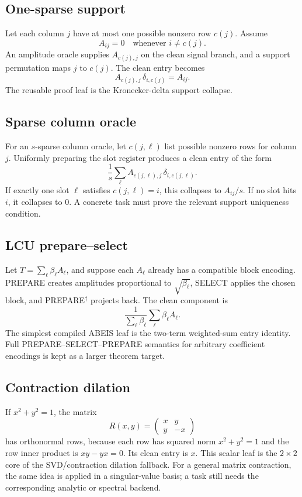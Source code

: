 \subsection{One-sparse support}

Let each column \(j\) have at most one possible nonzero row \(c(j)\).  Assume
\[
  A_{ij}=0\quad\text{whenever }i\neq c(j).
\]
An amplitude oracle supplies \(A_{c(j),j}\) on the clean signal branch, and a
support permutation maps \(j\) to \(c(j)\).  The clean entry becomes
\[
  A_{c(j),j}\,\delta_{i,c(j)} = A_{ij}.
\]
The reusable proof leaf is the Kronecker-delta support collapse.

\subsection{Sparse column oracle}

For an \(s\)-sparse column oracle, let \(c(j,\ell)\) list possible nonzero rows
for column \(j\).  Uniformly preparing the slot register produces a clean entry
of the form
\[
  \frac{1}{s}\sum_{\ell} A_{c(j,\ell),j}\,\delta_{i,c(j,\ell)}.
\]
If exactly one slot \(\ell\) satisfies \(c(j,\ell)=i\), this collapses to
\(A_{ij}/s\).  If no slot hits \(i\), it collapses to \(0\).  A concrete task
must prove the relevant support uniqueness condition.

\subsection{LCU prepare--select}

Let \(T=\sum_{\ell}\beta_\ell A_\ell\), and suppose each \(A_\ell\) already
has a compatible block encoding.  PREPARE creates amplitudes proportional to
\(\sqrt{\beta_\ell}\), SELECT applies the chosen block, and
PREPARE\({}^\dagger\) projects back.  The clean component is
\[
  \frac{1}{\sum_\ell \beta_\ell}
  \sum_\ell \beta_\ell A_\ell.
\]
The simplest compiled ABEIS leaf is the two-term weighted-sum entry identity.
Full PREPARE--SELECT--PREPARE semantics for arbitrary coefficient encodings is
kept as a larger theorem target.

\subsection{Contraction dilation}

If \(x^2+y^2=1\), the matrix
\[
  R(x,y)=
  \begin{pmatrix}
    x & y\\
    y & -x
  \end{pmatrix}
\]
has orthonormal rows, because each row has squared norm \(x^2+y^2=1\) and the
row inner product is \(xy-yx=0\).  Its clean entry is \(x\).  This scalar leaf
is the \(2\times2\) core of the SVD/contraction dilation fallback.  For a
general matrix contraction, the same idea is applied in a singular-value
basis; a task still needs the corresponding analytic or spectral backend.

